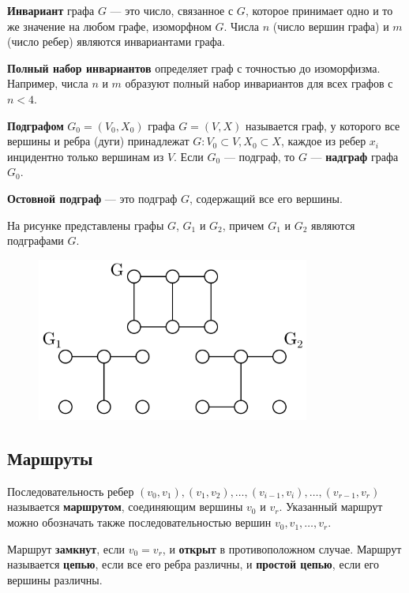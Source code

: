 \textbf{Инвариант} графа \(G\) --- это число, связанное с \(G\), которое принимает одно и то же значение на любом графе, изоморфном \(G\). Числа \(n\) (число вершин графа) и \(m\) (число ребер) являются инвариантами графа.

\textbf{Полный набор инвариантов} определяет граф с точностью до изоморфизма. Например, числа \(n\) и \(m\) образуют полный набор инвариантов для всех графов с \(n < 4\).

\textbf{Подграфом} \(G_0 = (V_0, X_0)\) графа \(G = (V, X)\) называется граф, у которого все вершины и ребра (дуги) принадлежат \(G: V_0 \subset V, X_0 \subset X\), каждое из ребер \(x_i\) инцидентно только вершинам из \(V\). Если \(G_0\) --- подграф, то \(G\) --- \textbf{надграф} графа \(G_0\).

\textbf{Остовной подграф} --- это подграф \(G\), содержащий все его вершины.

\begin{example*}
    На рисунке представлены графы \(G\), \(G_1\) и \(G_2\), причем \(G_1\) и \(G_2\) являются подграфами \(G\).
    \begin{figure}[H]
        \centering
        \includegraphics[width=0.8\textwidth]{./images/subgraph-example.png}
    \end{figure}
\end{example*}

\subsection{Маршруты}

Последовательность ребер \((v_0, v_1), (v_1, v_2), \ldots, (v_{i - 1}, v_i), \ldots, (v_{r - 1}, v_r)\) называется \textbf{маршрутом}, соединяющим вершины \(v_0\) и \(v_r\). Указанный маршрут можно обозначать также последовательностью вершин \(v_0, v_1, \ldots, v_r\).

Маршрут \textbf{замкнут}, если \(v_0 = v_r\), и \textbf{открыт} в противоположном случае. Маршрут называется \textbf{цепью}, если все его ребра различны, и \textbf{простой цепью}, если его вершины различны.

